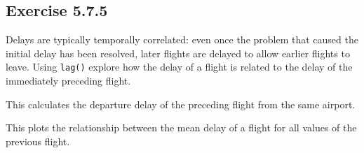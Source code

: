 \documentclass[]{book}
\newenvironment{Shaded}{\begin{snugshade}}{\end{snugshade}}
\newcommand{\DataTypeTok}[1]{\textcolor[rgb]{0.13,0.29,0.53}{#1}}
\newcommand{\KeywordTok}[1]{\textcolor[rgb]{0.13,0.29,0.53}{\textbf{#1}}}
\newcommand{\NormalTok}[1]{#1}
\newcommand{\OperatorTok}[1]{\textcolor[rgb]{0.81,0.36,0.00}{\textbf{#1}}}
\newcommand{\StringTok}[1]{\textcolor[rgb]{0.31,0.60,0.02}{#1}}
\theoremstyle{plain}
\theoremstyle{remark}
\theoremstyle{definition}
\theoremstyle{definition}
\theoremstyle{definition}
\theoremstyle{remark}
\begin{document}
\hypertarget{exercise-5.7.5}{%
\subsection*{\texorpdfstring{Exercise
{5.7.5}}{Exercise 5.7.5}}\label{exercise-5.7.5}}

Delays are typically temporally correlated: even once the problem that
caused the initial delay has been resolved, later flights are delayed to
allow earlier flights to leave. Using \texttt{lag()} explore how the
delay of a flight is related to the delay of the immediately preceding
flight.

This calculates the departure delay of the preceding flight from the
same airport.

\begin{Shaded}
\end{Shaded}

This plots the relationship between the mean delay of a flight for all
values of the previous flight.

\begin{Shaded}
\end{Shaded}
\end{document}
